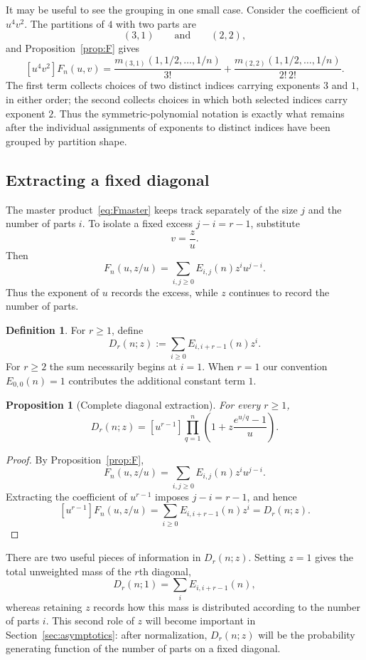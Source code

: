 \documentclass[11pt]{article}
\newtheorem{proposition}[theorem]{Proposition}
\theoremstyle{definition}
\newtheorem{definition}[theorem]{Definition}
\begin{document}
It may be useful to see the grouping in one small case.  Consider the
coefficient of $u^4v^2$.  The partitions of $4$ with two parts are
\[
        (3,1)\qquad\text{and}\qquad(2,2),
\]
and Proposition~\ref{prop:F} gives
\[
 [u^4v^2]F_n(u,v)
 =
 \frac{m_{(3,1)}(1,1/2,\ldots,1/n)}{3!}
 +
 \frac{m_{(2,2)}(1,1/2,\ldots,1/n)}{2!\,2!}.
\]
The first term collects choices of two distinct indices carrying
exponents $3$ and $1$, in either order; the second collects choices
in which both selected indices carry exponent $2$.  Thus the
symmetric-polynomial notation is exactly what remains after the
individual assignments of exponents to distinct indices have been
grouped by partition shape.

\subsection{Extracting a fixed diagonal}

The master product~\eqref{eq:Fmaster} keeps track separately of the
size $j$ and the number of parts $i$.  To isolate a fixed excess
$j-i=r-1$, substitute
\[
        v=\frac{z}{u}.
\]
Then
\[
        F_n(u,z/u)
        =
        \sum_{i,j\geq0}E_{i,j}(n)z^iu^{j-i}.
\]
Thus the exponent of $u$ records the excess, while $z$ continues to
record the number of parts.

\begin{definition}
For $r\geq1$, define
\[
 D_r(n;z)
 :=
 \sum_{i\geq0}E_{i,i+r-1}(n)z^i.
\]
For $r\geq2$ the sum necessarily begins at $i=1$.  When $r=1$ our
convention $E_{0,0}(n)=1$ contributes the additional constant term
$1$.
\end{definition}

\begin{proposition}[Complete diagonal extraction]
\label{prop:diagonal}
For every $r\geq1$,
\begin{equation}\label{eq:Dr}
 D_r(n;z)
 =
 [u^{r-1}]
 \prod_{q=1}^n
 \left(
 1+z\frac{e^{u/q}-1}{u}
 \right).
\end{equation}
\end{proposition}

\begin{proof}
By Proposition~\ref{prop:F},
\[
 F_n(u,z/u)
 =
 \sum_{i,j\geq0}E_{i,j}(n)z^iu^{j-i}.
\]
Extracting the coefficient of $u^{r-1}$ imposes
$j-i=r-1$, and hence
\[
 [u^{r-1}]F_n(u,z/u)
 =
 \sum_{i\geq0}E_{i,i+r-1}(n)z^i
 =
 D_r(n;z).
\]
\end{proof}

There are two useful pieces of information in $D_r(n;z)$.  Setting
$z=1$ gives the total unweighted mass of the $r$th diagonal,
\[
        D_r(n;1)
        =
        \sum_iE_{i,i+r-1}(n),
\]
whereas retaining $z$ records how this mass is distributed according
to the number of parts $i$.  This second role of $z$ will become
important in Section~\ref{sec:asymptotics}: after normalization,
$D_r(n;z)$ will be the probability generating function of the number
of parts on a fixed diagonal.
\end{document}

